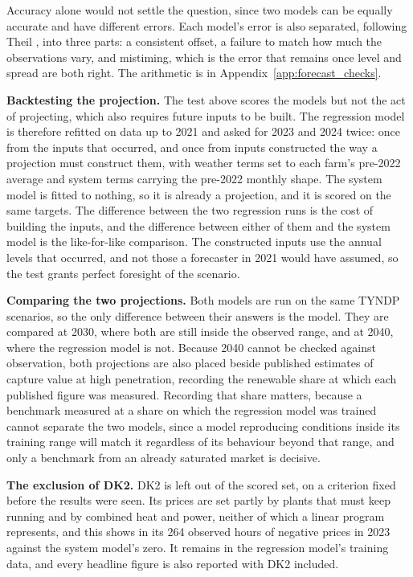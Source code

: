 Accuracy alone would not settle the question, since two models can be equally
accurate and have different errors. Each model's error is also separated,
following Theil \cite{Theil1966}, into three parts: a consistent offset, a
failure to match how much the observations vary, and mistiming, which is the
error that remains once level and spread are both right. The arithmetic is in
Appendix~\ref{app:forecast_checks}.

\textbf{Backtesting the projection.} The test above scores the models but not
the act of projecting, which also requires future inputs to be built. The
regression model is therefore refitted on data up to 2021 and asked for 2023 and
2024 twice: once from the inputs that occurred, and once from inputs
constructed the way a projection must construct them, with weather terms set to
each farm's pre-2022 average and system terms carrying the pre-2022 monthly
shape. The system model is fitted to nothing, so it is already a projection, and
it is scored on the same targets. The difference between the two regression runs
is the cost of building the inputs, and the difference between either of them
and the system model is the like-for-like comparison. The constructed inputs use
the annual levels that occurred, and not those a forecaster in 2021 would have
assumed, so the test grants perfect foresight of the scenario.

\textbf{Comparing the two projections.} Both models are run on the same TYNDP
scenarios, so the only difference between their answers is the model. They are
compared at 2030, where both are still inside the observed range, and at 2040,
where the regression model is not. Because 2040 cannot be checked against
observation, both projections are also placed beside published estimates of
capture value at high penetration, recording the renewable share at which each
published figure was measured. Recording that share matters, because a benchmark measured at a share on which
the regression model was trained cannot separate the two models, since a model
reproducing conditions inside its training range will match it regardless of
its behaviour beyond that range, and only a benchmark from an already
saturated market is decisive.

\textbf{The exclusion of DK2.} DK2 is left out of the scored set, on a criterion
fixed before the results were seen. Its prices are set partly by plants that
must keep running and by combined heat and power, neither of which a linear
program represents, and this shows in its 264 observed hours of negative prices
in 2023 against the system model's zero. It remains in the regression model's
training data, and every headline figure is also reported with DK2 included.

